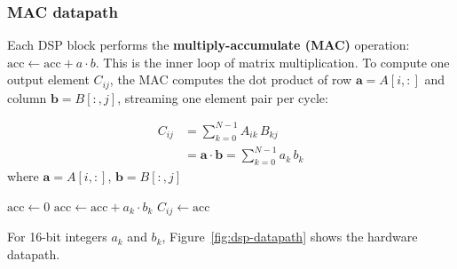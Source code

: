 \documentclass[9pt, a4paper]{extarticle}
\begin{document}
\subsubsection{MAC datapath}

Each DSP block performs the \textbf{multiply-accumulate (MAC)} operation: $\text{acc} \leftarrow \text{acc} + a \cdot b$. This is the inner loop of matrix multiplication. To compute one output element $C_{ij}$, the MAC computes the dot product of row $\mathbf{a} = A[i,:]$ and column $\mathbf{b} = B[:,j]$, streaming one element pair per cycle:

\noindent
\begin{minipage}[t]{0.40\textwidth}
\vspace{0pt}
$$
\begin{aligned}
C_{ij} &= \sum_{k=0}^{N-1} A_{ik}\, B_{kj} \\[4pt]
       &= \mathbf{a} \cdot \mathbf{b} = \sum_{k=0}^{N-1} a_k \, b_k
\end{aligned}
$$
\vspace{-6pt}
\centering\footnotesize
where $\mathbf{a} = A[i,:]$,\; $\mathbf{b} = B[:,j]$
\end{minipage}%
\hfill
\begin{minipage}[t]{0.4\textwidth}
\vspace{0pt}
\begin{algorithm}[H]
\footnotesize
\caption{MAC (one DSP, $N$ cycles)}
\begin{algorithmic}[1]
\State $\text{acc} \gets 0$ 
 
    \State $\text{acc} \gets \text{acc} + a_k \cdot b_k$
\EndFor
\State $C_{ij} \gets \text{acc}$
\end{algorithmic}
\end{algorithm}
\end{minipage}

\vspace{6pt}

For 16-bit integers $a_k$ and $b_k$, Figure~\ref{fig:dsp-datapath} shows the hardware datapath.
\end{document}
